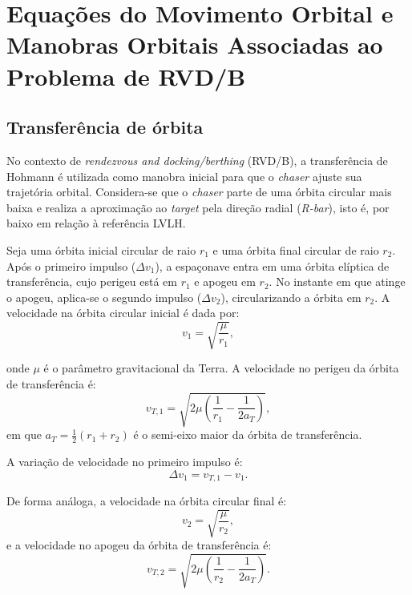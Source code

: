 \section{Equações do Movimento Orbital e Manobras Orbitais Associadas ao Problema de RVD/B}
\subsection{Transferência de órbita}
\label{sec:hohmann}


No contexto de \emph{rendezvous and docking/berthing} (RVD/B), a transferência de Hohmann é utilizada como manobra inicial para que o \emph{chaser} ajuste sua trajetória orbital. 
Considera-se que o \emph{chaser} parte de uma órbita circular mais baixa e realiza a aproximação ao \emph{target} pela direção radial (\emph{R-bar}), isto é, por baixo em relação à referência LVLH.

Seja uma órbita inicial circular de raio $r_1$ e uma órbita final circular de raio $r_2$. 
Após o primeiro impulso ($\Delta v_1$), a espaçonave entra em uma órbita elíptica de transferência, cujo perigeu está em $r_1$ e apogeu em $r_2$. 
No instante em que atinge o apogeu, aplica-se o segundo impulso ($\Delta v_2$), circularizando a órbita em $r_2$. A velocidade na órbita circular inicial é dada por:
\begin{equation}
    v_1 = \sqrt{\frac{\mu}{r_1}},
\end{equation}

onde $\mu$ é o parâmetro gravitacional da Terra. 
A velocidade no perigeu da órbita de transferência é:
\begin{equation}
    v_{T,1} = \sqrt{2\mu \left(\frac{1}{r_1} - \frac{1}{2a_T}\right)},
\end{equation}
em que $a_T = \tfrac{1}{2}(r_1+r_2)$ é o semi-eixo maior da órbita de transferência.

A variação de velocidade no primeiro impulso é:
\begin{equation}
    \Delta v_1 = v_{T,1} - v_1.
\end{equation}

De forma análoga, a velocidade na órbita circular final é:
\begin{equation}
    v_2 = \sqrt{\frac{\mu}{r_2}},
\end{equation}
e a velocidade no apogeu da órbita de transferência é:
\begin{equation}
    v_{T,2} = \sqrt{2\mu \left(\frac{1}{r_2} - \frac{1}{2a_T}\right)}.
\end{equation}

